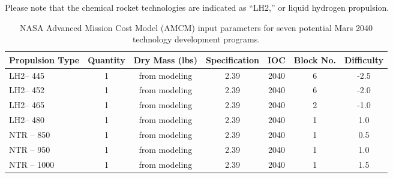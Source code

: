 \documentclass[]{aiaa-pretty}
\begin{document}
Please note that the chemical rocket technologies are indicated as “LH2,” or liquid hydrogen propulsion.

\begin{table}[b]
\centering
\caption{NASA Advanced Mission Cost Model (AMCM) input parameters for seven potential Mars 2040 technology development programs.}
\label{tab:AMCM}
\begin{tabular}{lcccccc}
\textbf{Propulsion Type} & \multicolumn{1}{l}{\textbf{Quantity}} & \multicolumn{1}{l}{\textbf{Dry Mass (lbs)}} & \multicolumn{1}{l}{\textbf{Specification}} & \multicolumn{1}{l}{\textbf{IOC}} & \multicolumn{1}{l}{\textbf{Block No.}} & \multicolumn{1}{l}{\textbf{Difficulty}} \\\hline
LH2– 445                         & 1                                     & from modeling                               & 2.39                                       & 2040                                                      & 6                                      & -2.5                                    \\
LH2– 452                         & 1                                     & from modeling                               & 2.39                                       & 2040                                                      & 6                                      & -2.0                                    \\
LH2– 465                         & 1                                     & from modeling                               & 2.39                                       & 2040                                                      & 2                                      & -1.0                                    \\
LH2– 480                         & 1                                     & from modeling                               & 2.39                                       & 2040                                                      & 1                                      & 1.0                                     \\
NTR – 850                        & 1                                     & from modeling                               & 2.39                                       & 2040                                                      & 1                                      & 0.5                                     \\
NTR – 950                        & 1                                     & from modeling                               & 2.39                                       & 2040                                                      & 1                                      & 1.0                                     \\
NTR – 1000                       & 1                                     & from modeling                               & 2.39                                       & 2040                                                      & 1                                      & 1.5                                    
\end{tabular}
\end{table}
\end{document}
